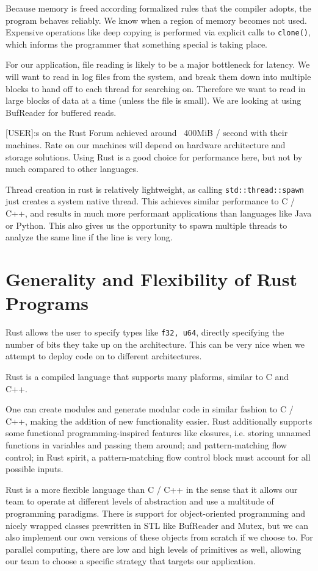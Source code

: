 Because memory is freed according formalized rules that 
the compiler adopts, the program behaves reliably. We know 
when a region of memory becomes not used. Expensive 
operations like deep copying is performed via explicit calls
to \texttt{clone()}, which informs the programmer that
something special is taking place.

For our application, file reading is likely to be a major bottleneck for
latency. We will want to read in log files from the system, and break
them down into multiple blocks to hand off to each thread for searching
on. Therefore we want to read in large blocks of data at a time (unless
the file is small). We are looking at using BufReader for buffered reads.

[USER]:s on the Rust Forum achieved around ~400MiB / second with their
machines. Rate on our machines will depend on hardware architecture
and storage solutions. Using Rust is a good choice for performance here,
but not by much compared to other languages.

Thread creation in rust is relatively lightweight, as calling 
\texttt{std::thread::spawn}  just creates a system native thread. 
This achieves similar performance to C / C++, and results in much more
performant applications than languages like Java or Python.
This also gives us the opportunity to spawn multiple threads to
analyze the same line if the line is very long.

\section{Generality and Flexibility of Rust Programs}

Rust allows the user to specify types like \texttt{f32, u64}, directly
specifying the number of bits they take up on the architecture. This can be
very nice when we attempt to deploy code on to different architectures.

Rust is a compiled language that supports many plaforms, similar to C
and C++.

One can create modules and generate modular code in similar fashion
to C / C++, making the addition of new functionality easier. Rust additionally
supports some functional programming-inspired features like closures,
i.e. storing unnamed functions in variables and passing them around; and
pattern-matching flow control; in Rust spirit, a pattern-matching flow
control block must account for all possible inputs.

Rust is a more flexible language than C / C++ in the sense that it allows our
team to operate at different levels of abstraction and use a multitude of 
programming paradigms. There is support for object-oriented programming
and nicely wrapped classes prewritten in STL like BufReader and 
Mutex, but we can also implement our own versions of these objects from 
scratch if we choose to. For parallel computing, there are low and high levels
of primitives as well, allowing our team to choose a specific strategy that
targets our application. 

